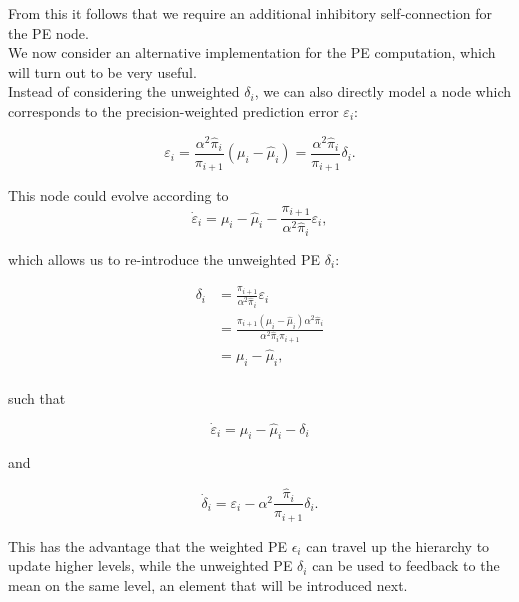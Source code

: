 From this it follows that we require an additional inhibitory self-connection for the \textsf{PE} node.\\

We now consider an alternative implementation for the \textsf{PE} computation, which will turn out to be very useful.\\

Instead of considering the unweighted $\delta_i$, we can also directly model a node which corresponds to the precision-weighted prediction error $\varepsilon_i$:

\begin{equation}
	\varepsilon_i = \frac{\alpha^2 \hat{\pi}_i}{\pi_{i+1}} (\mu_i - \hat{\mu}_i) = \frac{\alpha^2 \hat{\pi}_i}{\pi_{i+1}} \delta_i.
\end{equation}

This node could evolve according to
\begin{equation}
	\dot{\varepsilon}_i = \mu_i - \hat{\mu}_i -  \frac{\pi_{i+1}}{\alpha^2 \hat{\pi}_i} \varepsilon_i,
\end{equation}

which allows us to re-introduce the unweighted \textsf{PE} $\delta_i$:

\begin{equation}
	\begin{split}
		\delta_i &= \frac{\pi_{i+1}}{\alpha^2 \hat{\pi}_i} \varepsilon_i \\
		&= \frac{\pi_{i+1} (\mu_i - \hat{\mu}_i) \alpha^2 \hat{\pi}_i}{\alpha^2 \hat{\pi}_i \pi_{i+1}}\\
		&= \mu_i - \hat{\mu}_i,\\
	\end{split}
\end{equation}

such that

\begin{equation}
	\dot{\varepsilon}_i = \mu_i - \hat{\mu}_i - \delta_i
\end{equation}

and

\begin{equation}
	\dot{\delta}_i = \varepsilon_i - \alpha^2 \frac{\hat{\pi}_i}{\pi_{i+1}} \delta_i.
\end{equation}

This has the advantage that the weighted \textsf{PE} $\epsilon_i$ can travel up the hierarchy to update higher levels, while the unweighted \textsf{PE} $\delta_i$ can be used to feedback to the mean on the same level, an element that will be introduced next.\\ 

